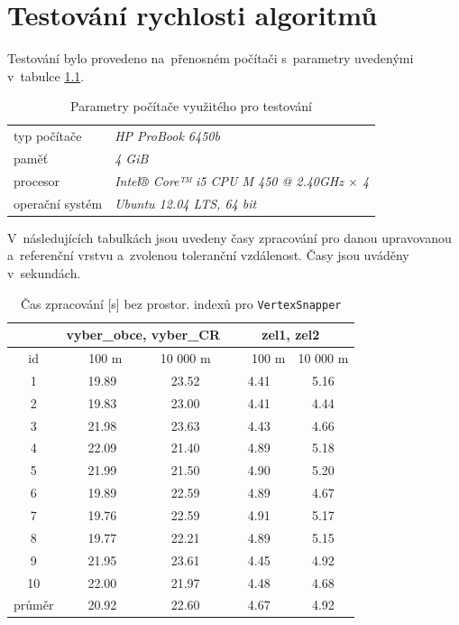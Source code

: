 \chapter{Testování rychlosti algoritmů}
\label{priloha-testovani}

Testování bylo provedeno na~přenosném počítači s~parametry uvedenými v~tabulce 
\ref{tab:parametry}.

\begin{table}[!h]
 \centering
\begin{tabular}{l|l}
 typ počítače & \textit{HP ProBook 6450b} \\
 paměť & \textit{4 GiB} \\
 procesor &\textit{Intel® Core™ i5 CPU M 450 @ 2.40GHz $\times$ 4 }\\
 operační systém &\textit{Ubuntu 12.04 LTS, 64 bit}\\
\end{tabular}
  \caption{ Parametry počítače využitého pro testování}
  \label{tab:parametry}
\end{table}

V~následujících tabulkách jsou uvedeny časy zpracování pro danou upravovanou
a~referenční vrstvu a~zvolenou toleranční vzdálenost. Časy jsou uváděny 
v~sekundách.

\begin{table}[!h]
\centering
 \begin{tabular}{|c|c|c|c|c|}
  \hline
     & \multicolumn{2}{c|}{vyber\_obce, vyber\_CR} & 
	\multicolumn{2}{c|}{zel1, zel2} \\
  \hline
   id  &  ~~100 m~ & 10 000 m & ~~~100 m & 10 000 m\\
  \hline
  \hline
  1  & 19.89 & 23.52 & 4.41 & 5.16 \\ 
2  & 19.83 & 23.00 & 4.41 & 4.44 \\
3  & 21.98 & 23.63 & 4.43 & 4.66 \\
4  & 22.09 & 21.40 & 4.89 & 5.18 \\
5  & 21.99 & 21.50 & 4.90 & 5.20 \\
6  & 19.89 & 22.59 & 4.89 & 4.67 \\
7  & 19.76 & 22.59 & 4.91 & 5.17 \\
8  & 19.77 & 22.21 & 4.89 & 5.15 \\
9  & 21.95 & 23.61 & 4.45 & 4.92 \\
10 & 22.00 & 21.97 & 4.48 & 4.68 \\
  \hline
  \hline
  průměr & 20.92& 22.60 &4.67 & 4.92 \\
  \hline
 \end{tabular}
  \caption{ Čas zpracování [s] bez prostor. indexů pro 
	    \texttt{Vertex\-Snapper}}
  \label{tab:vs-bez}
\end{table}

